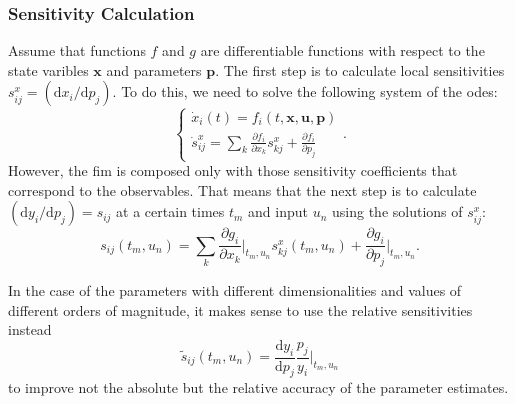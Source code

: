 \documentclass[10pt,A4paper]{article}
\newcommand{\mbx}{\mathbf{x}}
\newcommand{\mbu}{\mathbf{u}}
\newcommand{\mbp}{\mathbf{p}}
\begin{document}
\subsubsection*{Sensitivity Calculation}
Assume that functions $f$ and $g$ are differentiable functions with respect to the state varibles $\mbx$ and parameters $\mbp$.
The first step is to calculate local sensitivities $s^x_{ij} = (\mathrm{d} x_i / \mathrm{d} p_j )$.
To do this, we need to solve the following system of the \acp{ode}:
\begin{equation}
    \begin{cases}
    \dot x_i (t) = f_i(t, \mbx, \mbu, \mbp)\\
    \dot s^x_{ij} = \sum_k \frac{\partial f_i}{\partial x_k} s^x_{kj} + \frac{\partial f_i}{\partial p_j}
    \end{cases}.
\label{eq:ode_and_sensitiv}
\end{equation} 
However, the \ac{fim} is composed only with those sensitivity coefficients that correspond to the observables.
That means that the next step is to calculate $(\mathrm{d} y_i / \mathrm{d} p_j) = s_{ij}$ at a certain times $t_m$ and input $u_n$ using the solutions of $s^x_{ij}$:
\begin{equation}
    s_{ij} (t_m, u_n) = \sum_k \frac{\partial g_i}{\partial x_k}\bigg|_{t_m, u_n} s_{kj}^x (t_m, u_n) + \frac{\partial g_i}{\partial p_j}\bigg|_{t_m, u_n}.
\label{eq:observ_sensitivities}
\end{equation}

In the case of the parameters with different dimensionalities and values of different orders of magnitude, it makes sense to use the relative sensitivities instead
\begin{equation}
    \tilde{s}_{ij} (t_m, u_n) = \frac{\mathrm{d} y_i}{\mathrm{d} p_j} \frac{p_j}{y_i}\bigg|_{t_m, u_n}
\label{eq:relat_sensitivities}
\end{equation}
to improve not the absolute but the relative accuracy of the parameter estimates.
\end{document}
